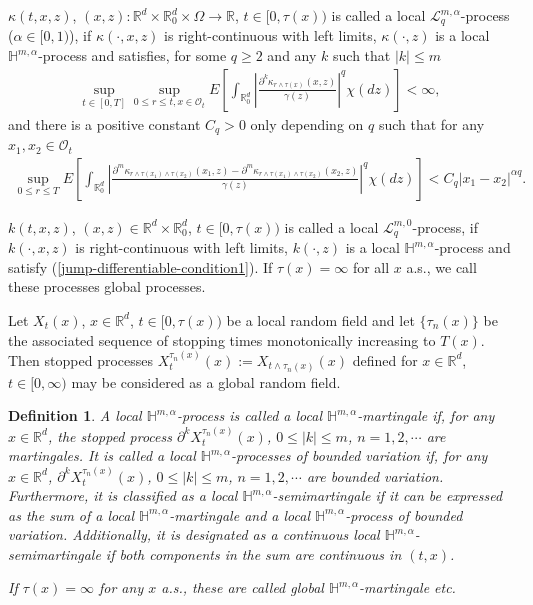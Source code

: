 \documentclass[12pt,oneside, reqno]{amsart}
\newcommand{\be}{\begin{eqnarray}}
\newcommand{\ee}{\end{eqnarray}}
\newtheorem{definition}[theorem]{Definition}
\def\mH{{\mathbb H}}
\def\mR{{\mathbb R}}
\def\sL{{\mathscr L}}
\def\geq{\geqslant}
\def\leq{\leqslant}
\numberwithin{equation}{section}
\begin{document}
$\kappa(t,x,z)$, $(x,z):\mR^d\times \mR^d_0\times \Omega \longrightarrow\mathbb R$, $t\in[0,\tau(x))$ is called a local $\sL_{q}^{m,\alpha}$-process ($\alpha\in [0,1)$), if $\kappa(\cdot,x,z)$  is right-continuous with left limits,   $\kappa(\cdot,z)$ is a  local  $\mH^{m,\alpha}$-process  and satisfies,  for some $q\geq 2$ and any $k$ such that $|k|\leq m$ 
\be\label{jump-differentiable-condition1} 
\sup_{t\in[0,T]}\sup_{0\leq r\leq t,x\in \mathscr O_t}E\left[\int_{\mR^d_0} \left|\frac{\partial^k \kappa_{r\wedge \tau (x)}(x,z)}{\gamma(z)}\right|^q \chi(dz)\right] <\infty,
\ee 
and there is a positive constant $C_q>0$ only depending on $q$ such that for any $x_1,x_2\in \mathscr O_t$
\be \label{jump-differentiable-Holder-condition2} 
\sup_{0\leq r\leq T}E\left[\int_{\mR^d_0} \left|\frac{\partial^m \kappa_{r\wedge \tau(x_1)\wedge\tau(x_2)}(x_1,z)-\partial^m \kappa_{r\wedge \tau(x_1)\wedge\tau(x_2)}(x_2,z)}{\gamma(z)}\right|^q \chi(dz)\right]<C_q |x_1-x_2|^{\alpha q}.
\ee 
 
 $k(t,x,z)$, $(x,z)\in\mR^d\times \mR^d_0$, $t\in[0,\tau(x))$ is called a local $\sL_{q}^{m,0}$-process, if $k(\cdot,x,z)$  is right-continuous with left limits,   $k(\cdot,z)$ is a  local  $\mH^{m,\alpha}$-process and  satisfy (\ref{jump-differentiable-condition1}). If $\tau(x)=\infty$ for all $x$ a.s., we call these processes  global processes.
 
 
 

Let $X_t(x)$, $x\in\mR^d$, $t\in[0,\tau(x))$ be a local random field and let $\{\tau_n(x)\}$ be the associated sequence of stopping times monotonically increasing to $T(x)$. Then stopped processes $X_t^{\tau_n(x)}(x):=X_{t\wedge \tau_n(x)}(x)$ defined for $x\in\mR^d$, $t\in[0,\infty)$ may be considered as a global random field. 

\begin{definition}
	A local $\mH^{m,\alpha}$-process is called a local $\mH^{m,\alpha}$-martingale if, for any $x\in\mR^d$,  the stopped process $\partial^kX_t^{\tau_n(x)}(x)$, $0\leq |k|\leq m$, $n=1,2,\cdots$ are  martingales. It is called a local $\mH^{m,\alpha}$-processes of bounded variation if, for any $x\in\mR^d$,  $\partial^kX_t^{\tau_n(x)}(x)$, $0\leq |k|\leq m$, $n=1,2,\cdots$ are bounded variation. Furthermore, it is classified as a  local  $\mH^{m,\alpha}$-semimartingale if it can be expressed as the sum of a  local  $\mH^{m,\alpha}$-martingale and a  local  $\mH^{m,\alpha}$-process of bounded variation. 	Additionally, it is designated as a continuous local  $\mH^{m,\alpha}$-semimartingale 
	if both components in the sum are continuous in $(t,x)$.
	
	If $\tau(x)=\infty$ for any $x$ a.s., these are called global $\mH^{m,\alpha}$-martingale etc.   
	\end{definition}
\end{document}
